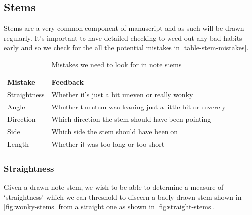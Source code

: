 \subsection{Stems}

Stems are a very common component of manuscript and as such will be drawn regularly. It's important to have detailed checking to weed out any bad habits early and so we check for the all the potential mistakes in \cref{table-stem-mistakes}.

\begin{table}[H]
    \renewcommand{\arraystretch}{1.6}
    \begin{tabularx}{\textwidth}{ lX }
        \toprule
        Mistake & Feedback \\
        \midrule
        Straightness & Whether it's just a bit uneven or really wonky \\
        Angle & Whether the stem was leaning just a little bit or severely \\
        Direction & Which direction the stem should have been pointing \\
        Side & Which side the stem should have been on \\
        Length & Whether it was too long or too short\\
        \bottomrule
    \end{tabularx}

    \caption{Mistakes we need to look for in note stems}
    \label{table:stem-mistakes}
\end{table}

\subsubsection{Straightness}\label{sec:scoring-stem-straightness}

Given a drawn note stem, we wish to be able to determine a measure of `straightness' which we can threshold to discern a badly drawn stem shown in \cref{fig:wonky-stems} from a straight one  as shown in \cref{fig:straight-stems}.

